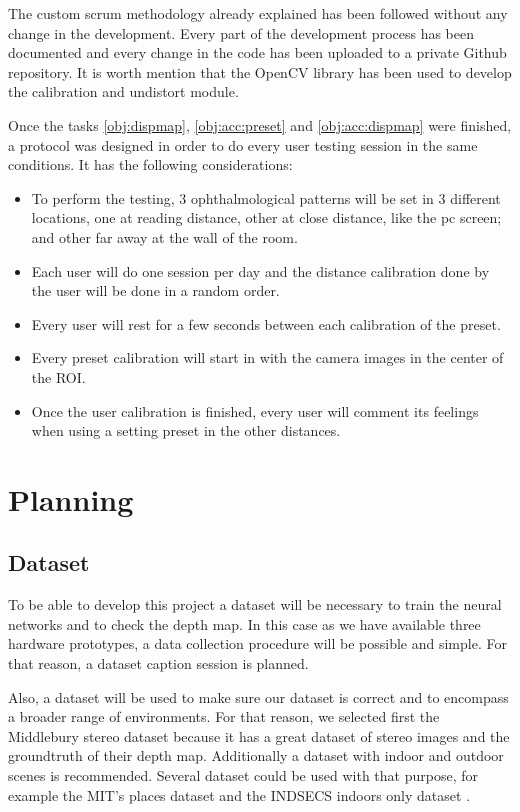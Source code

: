 \documentclass[10pt,a4paper,twocolumn,twoside]{article}
\begin{document}
	The custom scrum methodology already explained has been followed without any change in the development. Every part of the development process has been documented and every change in the code has been uploaded to a private Github repository. It is worth mention that the OpenCV \cite{web:opencv} library has been used to develop the calibration and undistort module. 
	
	Once the tasks \ref{obj:dispmap}, \ref{obj:acc:preset} and \ref{obj:acc:dispmap} were finished, a protocol was designed in order to do every user testing session in the same conditions. It has the following considerations: 

	\begin{itemize}
		\item To perform the testing, 3 ophthalmological patterns will be set in 3 different locations, one at reading distance, other at close distance, like the pc screen; and other far away at the wall of the room. 
		\item  Each user will do one session per day and the distance calibration done by the user will be done in a random order. 
		\item  Every user will rest for a few seconds between each calibration of the preset.  
		\item  Every preset calibration will start in with the camera images in the center of the ROI. 
		\item  Once the user calibration is finished, every user will comment its feelings when using a setting preset in the other distances. 
	\end{itemize}
	
	
	\section{Planning}
	\label{sec:planning}
	
	\subsection{Dataset}
	\label{subsec:dataset}
	To be able to develop this project a dataset will be necessary to train the neural networks and to check the depth map. In this case as we have available three hardware prototypes, a data collection procedure will be possible and simple. For that reason, a dataset caption session is planned.
	
	Also, a dataset will be used to make sure our dataset is correct and to encompass a broader range of environments. For that reason, we selected first the Middlebury stereo dataset \cite{web:middelburyDataset} because it has a great dataset of stereo images and the groundtruth of their depth map. Additionally a dataset with indoor and outdoor scenes is recommended. Several dataset could be used with that purpose, for example the MIT's places dataset \cite{web:mitplaces} and the INDSECS indoors only dataset \cite{web:indecs}.
	
\end{document}
